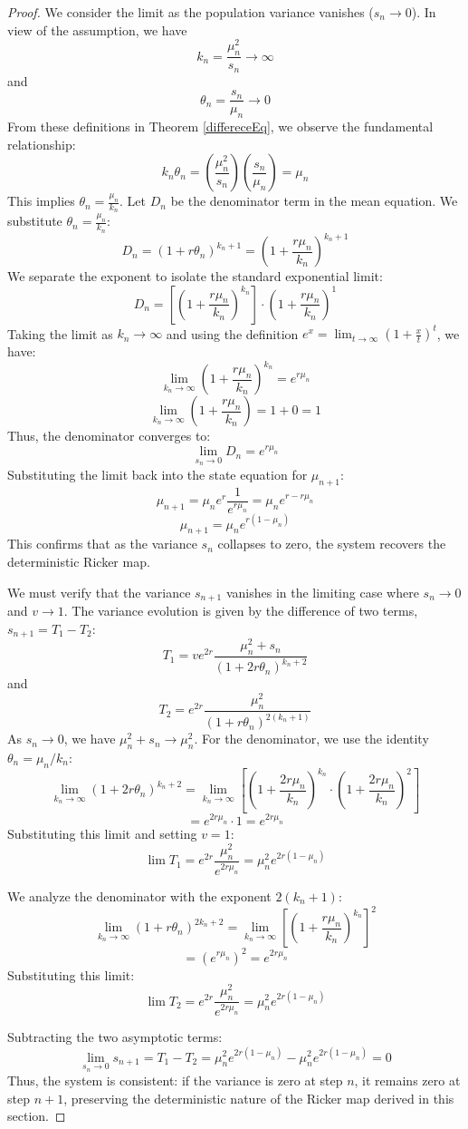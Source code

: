 \documentclass[12pt]{article}
\theoremstyle{definition}
\begin{document}
\begin{proof}
We consider the limit as the population variance vanishes ($s_n \to 0$). In view of the assumption, we have
 $$k_n = \frac{\mu_n^2}{s_n} \to \infty$$
and 
$$\theta_n = \frac{s_n}{\mu_n} \to 0$$
From these definitions in Theorem \ref{differeceEq}, we observe the fundamental relationship:
\[
k_n \theta_n = \left(\frac{\mu_n^2}{s_n}\right) \left(\frac{s_n}{\mu_n}\right) = \mu_n
\]
This implies $\theta_n =  \frac{\mu_n}{k_n}$.  
Let $D_n$ be the denominator term in the mean equation. We substitute $\theta_n = \frac{\mu_n}{k_n}$:
\[
D_n = \left(1 + r \theta_n\right)^{k_n+1} = \left(1 + \frac{r \mu_n}{k_n}\right)^{k_n+1}
\]
We separate the exponent to isolate the standard exponential limit:
\[
D_n = \left[ \left(1 + \frac{r \mu_n}{k_n}\right)^{k_n} \right] \cdot \left(1 + \frac{r \mu_n}{k_n}\right)^1
\]
Taking the limit as $k_n \to \infty$ and using the definition $e^x = \lim_{t \to \infty} (1 + \frac{x}{t})^t$, we have:
    \[
    \lim_{k_n \to \infty} \left(1 + \frac{r \mu_n}{k_n}\right)^{k_n} = e^{r \mu_n}
    \]
    \[
    \lim_{k_n \to \infty} \left(1 + \frac{r \mu_n}{k_n}\right) = 1 + 0 = 1
    \]
Thus, the denominator converges to:
\[
\lim_{s_n \to 0} D_n = e^{r \mu_n}
\]
Substituting the limit back into the state equation for $\mu_{n+1}$:
\[
\mu_{n+1} = \mu_n e^r \frac{1}{e^{r \mu_n}} = \mu_n e^{r - r\mu_n}
\]
\[
\mu_{n+1} = \mu_n e^{r(1-\mu_n)}
\]
This confirms that as the variance $s_n$ collapses to zero, the system recovers the deterministic Ricker map.


We must verify that the variance $s_{n+1}$ vanishes in the limiting case where $s_n \to 0$ and $v \to 1$.
The variance evolution is given by the difference of two terms, $s_{n+1} = T_1 - T_2$:
\[
T_{1} = v e^{2r} \frac{\mu_n^2+s_n}{(1+2r \theta_n)^{k_n+2}} 
\]
and
\[
T_2 =  e^{2r} \frac{\mu_n^2}{(1+r \theta_n)^{2(k_n+1)}}
\]
As $s_n \to 0$, we have $\mu_n^2 + s_n \to \mu_n^2$. For the denominator, we use the identity $\theta_n = \mu_n / k_n$:
\[
\lim_{k_n \to \infty} (1 + 2r \theta_n)^{k_n+2} = \lim_{k_n \to \infty} \left[\left(1 + \frac{2r\mu_n}{k_n}\right)^{k_n} \cdot \left(1 + \frac{2r\mu_n}{k_n}\right)^2 \right]
\]
\[
= e^{2r\mu_n} \cdot 1 = e^{2r\mu_n}
\]
Substituting this limit and setting $v=1$:
\[
\lim T_1 = e^{2r} \frac{\mu_n^2}{e^{2r\mu_n}} = \mu_n^2 e^{2r(1-\mu_n)}
\]

We analyze the denominator with the exponent $2(k_n+1)$:
\[
\lim_{k_n \to \infty} (1 + r \theta_n)^{2k_n+2} = \lim_{k_n \to \infty} \left[ \left(1 + \frac{r\mu_n}{k_n}\right)^{k_n} \right]^2
\]
\[
= (e^{r\mu_n})^2 = e^{2r\mu_n}
\]
Substituting this limit:
\[
\lim T_2 = e^{2r} \frac{\mu_n^2}{e^{2r\mu_n}} = \mu_n^2 e^{2r(1-\mu_n)}
\]

Subtracting the two asymptotic terms:
\[
\lim_{s_n \to 0} s_{n+1} = T_1 - T_2 = \mu_n^2 e^{2r(1-\mu_n)} - \mu_n^2 e^{2r(1-\mu_n)} = 0
\]
Thus, the system is consistent: if the variance is zero at step $n$, it remains zero at step $n+1$, preserving the deterministic nature of the Ricker map derived in this section.

\end{proof}
\end{document}
